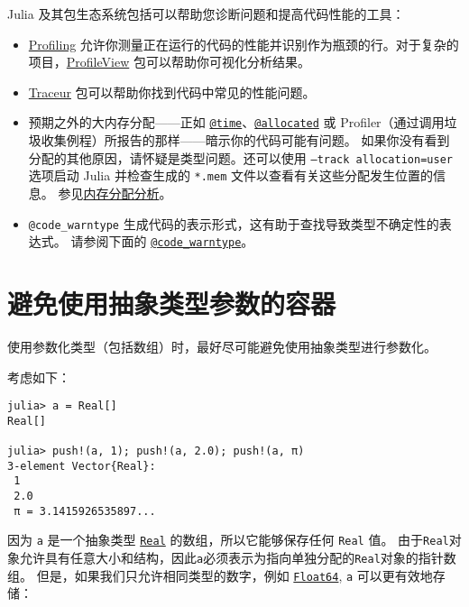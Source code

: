 Julia 及其包生态系统包括可以帮助您诊断问题和提高代码性能的工具：



\begin{itemize}
\item \hyperlink{4960174996145365052}{Profiling} 允许你测量正在运行的代码的性能并识别作为瓶颈的行。对于复杂的项目，\href{https://github.com/timholy/ProfileView.jl}{ProfileView} 包可以帮助你可视化分析结果。


\item \href{https://github.com/JunoLab/Traceur.jl}{Traceur} 包可以帮助你找到代码中常见的性能问题。


\item 预期之外的大内存分配——正如 \hyperlink{8029752041511656628}{\texttt{@time}}、\hyperlink{5377755456008435782}{\texttt{@allocated}} 或 Profiler（通过调用垃圾收集例程）所报告的那样——暗示你的代码可能有问题。 如果你没有看到分配的其他原因，请怀疑是类型问题。还可以使用 \texttt{--track allocation=user} 选项启动 Julia 并检查生成的 \texttt{*.mem} 文件以查看有关这些分配发生位置的信息。 参见\hyperlink{11696223907232256803}{内存分配分析}。


\item \texttt{@code\_warntype} 生成代码的表示形式，这有助于查找导致类型不确定性的表达式。 请参阅下面的 \hyperlink{8092893264277772840}{\texttt{@code\_warntype}}。

\end{itemize}


\hypertarget{12159424404022697469}{}


\section{避免使用抽象类型参数的容器}



使用参数化类型（包括数组）时，最好尽可能避免使用抽象类型进行参数化。



考虑如下：




\begin{verbatim}
julia> a = Real[]
Real[]

julia> push!(a, 1); push!(a, 2.0); push!(a, π)
3-element Vector{Real}:
 1
 2.0
 π = 3.1415926535897...
\end{verbatim}



因为 \texttt{a} 是一个抽象类型 \hyperlink{6175959395021454412}{\texttt{Real}} 的数组，所以它能够保存任何 \texttt{Real} 值。 由于\texttt{Real}对象允许具有任意大小和结构，因此\texttt{a}必须表示为指向单独分配的\texttt{Real}对象的指针数组。 但是，如果我们只允许相同类型的数字，例如 \hyperlink{5027751419500983000}{\texttt{Float64}},  \texttt{a} 可以更有效地存储：




